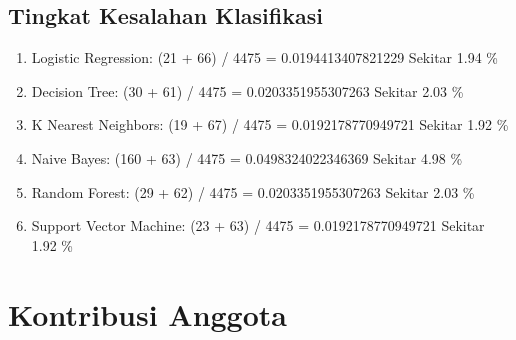 \documentclass[12pt]{article}
\begin{document}
\subsection{Tingkat Kesalahan Klasifikasi}

\begin{enumerate}

    \item Logistic Regression:
    \newline (21 + 66) / 4475 = 0.0194413407821229
    \newline Sekitar 1.94 \%
    
    \item Decision Tree:
    \newline (30 + 61) / 4475 = 0.0203351955307263
    \newline Sekitar 2.03 \%
    
    \item K Nearest Neighbors:
    \newline (19 + 67) / 4475 = 0.0192178770949721‬
    \newline Sekitar 1.92 \%
    
    \item Naive Bayes:
    \newline (160 + 63) / 4475 = 0.0498324022346369‬‬
    \newline Sekitar 4.98 \%
    
    \item Random Forest:
    \newline (29 + 62) / 4475 = 0.0203351955307263‬‬‬
    \newline Sekitar 2.03 \%
    
    \item Support Vector Machine:
    \newline (23 + 63) / 4475 = 0.0192178770949721‬‬‬
    \newline Sekitar 1.92 \%
    
\end{enumerate}


\hspace{1 cm}
\newpage


\section{Kontribusi Anggota}
\end{document}
